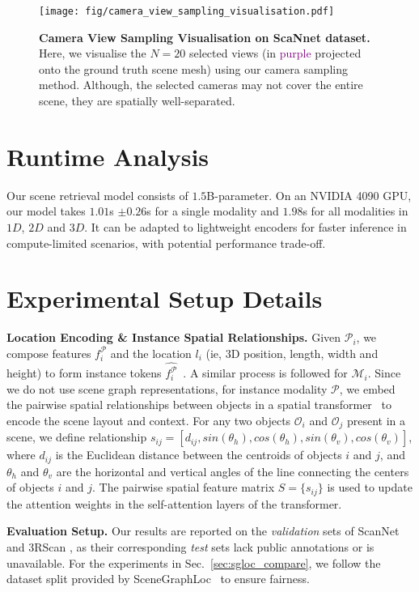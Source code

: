 \begin{figure*}
    \centering
    \texttt{[image: fig/camera\_view\_sampling\_visualisation.pdf]}
    \caption{\textbf{Camera View Sampling Visualisation on ScaNnet dataset.} Here, we visualise the $N=20$ selected views (in \textcolor{purple}{purple} projected onto the ground truth scene mesh) using  our camera sampling method. Although, the selected cameras may not cover the entire scene, they are spatially well-separated.}
    \label{fig:camera_view_sampling}
\end{figure*}  

\section{Runtime Analysis}
\label{sec:runtime_analysis}
Our scene retrieval model consists of $1.5$B-parameter. On an NVIDIA 4090 GPU, our model takes $1.01$s $\pm 0.26$s for a single modality and $1.98$s for all modalities in $1D$, $2D$ and $3D$. It can be adapted to lightweight encoders for faster inference in compute-limited scenarios, with potential performance trade-off.

\section{Experimental Setup Details}
\label{sec:exp_details}
\noindent \textbf{Location Encoding \& Instance Spatial Relationships.} Given $\mathcal{P}_i$, we compose features $f_i^\mathcal{P}$ and the location $l_i$ (ie, $3$D position, length, width and height) to form instance tokens $\hat{f_i^\mathcal{P}}$~\cite{3dvista}. A similar process is followed for $\mathcal{M}_i$. Since we do not use scene graph representations, for instance modality $\mathcal{P}$, we embed the pairwise spatial relationships between objects in a spatial transformer~\cite{jia2024sceneverse,3dvista} to encode the scene layout and context. For any two objects $\mathcal{O}_i$ and $\mathcal{O}_j$ present in a scene, we define relationship $s_{ij} = [d_{ij}, sin(\theta_h), cos(\theta_h), sin(\theta_v), cos(\theta_v)]$, where $d_{ij}$ is the Euclidean distance between the centroids of objects $i$ and $j$, and $\theta_h$ and $\theta_v$ are the horizontal and vertical angles of the line connecting the centers of objects $i$ and $j$. The pairwise spatial feature matrix $S = \{s_{ij}\}$ is used to update the attention weights in the self-attention layers of the transformer.

\noindent \textbf{Evaluation Setup.} Our results are reported on the \textit{validation} sets of ScanNet \cite{dai2017scannet} and 3RScan \cite{wald2019rio}, as their corresponding \textit{test} sets lack public annotations or is unavailable. For the experiments in Sec.~\ref{sec:sgloc_compare}, we follow the dataset split provided by SceneGraphLoc~\cite{miao2024scenegraphloc} to ensure fairness.

